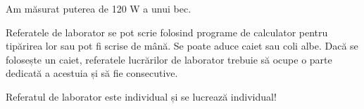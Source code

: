 \documentclass[12pt]{article}
\begin{document}
\begin{tcolorbox}[colback=yellow!10!white, colframe=black, title=Exemplu]
Am măsurat puterea de 120 W a unui bec.
\end{tcolorbox}

\begin{tcolorbox}[colback=yellow!10!white, colframe=black, title=Observație]
Referatele de laborator se pot scrie folosind programe de calculator pentru tipărirea lor sau pot fi scrise de mână.
Se poate aduce caiet sau coli albe. Dacă se folosește un caiet, referatele lucrărilor de laborator trebuie să ocupe o parte dedicată a acestuia
și să fie consecutive.
\end{tcolorbox}

\begin{tcolorbox}[colback=yellow!10!white, colframe=black, title=Observație]
Referatul de laborator este individual și se lucrează individual!
\end{tcolorbox}
\end{document}
